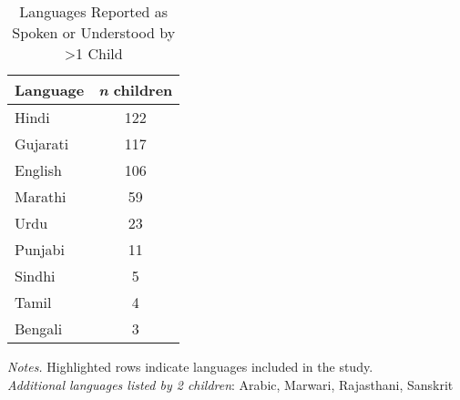 \begin{table}[t]
\caption{Languages Reported as Spoken or Understood by \textgreater1 Child}\label{tab:child-langs}
\centering
\begin{threeparttable}
\begin{tabular}{p{3cm}c}
\toprule
\textbf{Language} & \bfseries\textit{n} children\\
\midrule
\rowcolor{lightergreen}Hindi & 122 \\ 
\rowcolor{lightergreen}Gujarati & 117 \\ 
\rowcolor{lightergreen}English & 106 \\ 
\rowcolor{lightergreen}Marathi &  59 \\ 
\rowcolor{lightergreen}Urdu &  23 \\ 
Punjabi &  11 \\ 
Sindhi &   5 \\ 
\rowcolor{lightergreen}Tamil &   4 \\ 
Bengali &   3 \\ 
\bottomrule
\end{tabular}

\begin{tablenotes}
\small
\vspace{5pt}
      \item \textit{Notes.} {Highlighted rows indicate languages included in the study.}\\ 
      \textit{Additional languages listed by 2 children}: Arabic, Marwari, Rajasthani, Sanskrit\\
    \end{tablenotes}
  \end{threeparttable}
\end{table}
